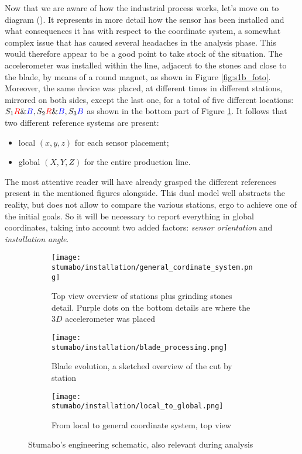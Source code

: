 Now that we are aware of how the industrial process works, let's move on to diagram ().
It represents in more detail how the sensor has been installed and what consequences it has with respect to the coordinate system, 
a somewhat complex issue that has caused several headaches in the analysis phase. This would therefore appear to be a good point to take stock of the situation.
The accelerometer was installed within the line, adjacent to the stones and close to the blade, by means of a round magnet, as shown in Figure \ref{fig:s1b_foto}.
Moreover, the same device was placed, at different times in different stations, mirrored on both sides, except the last one, for a total of five different locations: 
${S_{1}\textcolor{red}{R}\&\textcolor{blue}{B}, S_{2}\textcolor{red}{R}\&\textcolor{blue}{B}, S_{3}\textcolor{blue}{B}}$ as shown in the bottom part of Figure \ref{fig:top_view_line}.
It follows that two different reference systems are present:
\begin{itemize}
    \item local $(x,y,z)$ for each sensor placement;
    \item global $(X,Y,Z)$ for the entire production line.
\end{itemize}
The most attentive reader will have already grasped the different references present in the mentioned figures alongside. %
This dual model well abstracts the reality, but does not allow to compare the various stations, ergo to achieve one of the initial goals.
So it will be necessary to report everything in global coordinates, taking into account two added factors: \textit{sensor orientation} and \textit{installation angle}. 
\begin{figure}[!htp]
    \begin{subfigure}{\textwidth}
        \texttt{[image: stumabo/installation/general\_cordinate\_system.png]}
        \caption{Top view overview of stations plus grinding stones detail.
            Purple dots on the bottom details are where the $3D$ accelerometer was placed}
        \label{fig:top_view_line}
    \end{subfigure}
    \begin{subfigure}{\textwidth}
        \texttt{[image: stumabo/installation/blade\_processing.png]}
        \caption{Blade evolution, a sketched overview of the cut by station}
        \label{fig:blade_evolution}
    \end{subfigure}
    \begin{subfigure}{\textwidth}
        \texttt{[image: stumabo/installation/local\_to\_global.png]}
        \caption{From local to general coordinate system, top view}
        \label{fig:local_to_global}
    \end{subfigure}
    \caption{Stumabo's engineering schematic, also relevant during analysis}
    \label{fig:engineering_files}
\end{figure}


